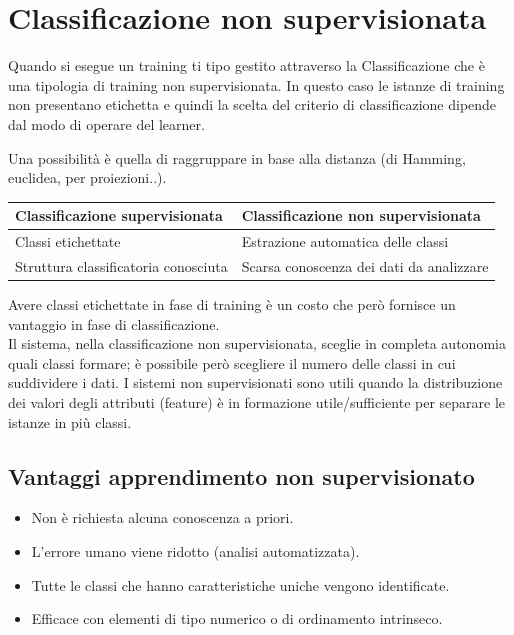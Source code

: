 \section{Classificazione non supervisionata}
Quando si esegue un training ti tipo gestito attraverso la Classificazione che è una tipologia di training non supervisionata. In questo caso le istanze di training non presentano etichetta e quindi la scelta del criterio di classificazione dipende dal modo di operare del learner.

Una possibilità è quella di raggruppare in base alla distanza (di Hamming, euclidea, per proiezioni..).

\begin{table}[H]
    \begin{center}
        \begin{tabular}{|l|l|}
            \hline
            \textbf{Classificazione supervisionata}       & \textbf{Classificazione non supervisionata}       \\ \hline
            Classi etichettate                   & Estrazione automatica delle classi       \\ \hline
            Struttura classificatoria conosciuta & Scarsa conoscenza dei dati da analizzare \\ \hline
        \end{tabular}
    \end{center}
\end{table}
Avere classi etichettate in fase di training è un costo che però fornisce un vantaggio in fase di classificazione. \\

Il sistema, nella classificazione non supervisionata, sceglie in completa autonomia quali classi formare; è possibile però scegliere il numero delle classi in cui suddividere i dati.
I sistemi non supervisionati sono utili quando la distribuzione dei valori degli attributi (feature) è in formazione utile/sufficiente per separare le istanze in più classi.

\subsection{Vantaggi apprendimento non supervisionato}
\begin{itemize}
    \item  Non è richiesta alcuna conoscenza a priori.
    \item  L’errore umano viene ridotto (analisi automatizzata).
    \item  Tutte le classi che hanno caratteristiche uniche vengono identificate.
    \item  Efficace con elementi di tipo numerico o di ordinamento intrinseco.
\end{itemize}

